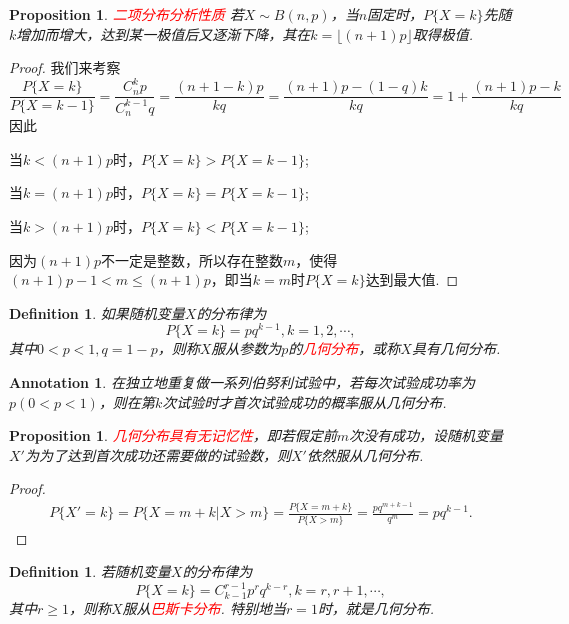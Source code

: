 \documentclass{article}
\newtheorem{proposition}[theorem]{Proposition}
\newtheorem{definition}[theorem]{Definition}
\newtheorem{annotation}[theorem]{Annotation}
\newcommand{\redt}[1]{\textcolor{red}{#1}}
\begin{document}
\begin{proposition}
\rm \redt{二项分布分析性质} 若$X \sim B(n,p)$，当$n$固定时，$P\{X=k\}$先随$k$增加而增大，达到某一极值后又逐渐下降，其在$k=\lfloor(n+1)p\rfloor$取得极值. 
\end{proposition}

\begin{proof}
\rm 我们来考察
$$
\frac{P\{X=k\}}{P\{X=k-1\}} = \frac{C_n^k p}{C_n^{k-1}q} = \frac{(n+1-k)p}{kq} = \frac{(n+1)p-(1-q)k}{kq} = 1+ \frac{(n+1)p - k}{kq}
$$
因此

当$k < (n+1)p$时，$P\{X=k\} > P\{X = k-1\}$;

当$k = (n+1)p$时，$P\{X=k\} = P\{X = k-1\}$;

当$k > (n+1)p$时，$P\{X=k\} < P\{X = k-1\}$;

因为$(n+1)p$不一定是整数，所以存在整数$m$，使得$(n+1)p-1 < m \leq (n+1)p$，即当$k = m$时$P\{X=k\}$达到最大值.  
\end{proof}

\begin{definition}
\rm 如果随机变量$X$的分布律为
$$
P\{X=k\} = pq^{k-1}, k =1,2,\cdots,
$$
其中$0 < p < 1, q= 1- p$，则称$X$服从参数为$p$的\redt{几何分布}，或称$X$具有几何分布.
\end{definition}

\begin{annotation}
\rm 在独立地重复做一系列伯努利试验中，若每次试验成功率为$p(0 < p < 1)$，则在第$k$次试验时才首次试验成功的概率服从几何分布.
\end{annotation}

\begin{proposition}
\rm \redt{几何分布具有无记忆性}，即若假定前$m$次没有成功，设随机变量$X'$为为了达到首次成功还需要做的试验数，则$X'$依然服从几何分布.
\end{proposition}

\begin{proof}
$$
\begin{array}{ll}
P\{X' = k\} = P\{X=m+k| X > m\} = \frac{P\{X = m+k\}}{P\{X > m\}} = \frac{pq^{m+k-1}}{q^m} = pq^{k-1}. 
\end{array}
$$
\end{proof}

\begin{definition}
\rm 若随机变量$X$的分布律为
$$
P\{X=k\} = C_{k-1}^{r-1}p^rq^{k-r},k=r,r+1,\cdots,
$$
其中$r \geq 1$，则称$X$服从\redt{巴斯卡分布}. 特别地当$r=1$时，就是几何分布. 
\end{definition}
\end{document}
